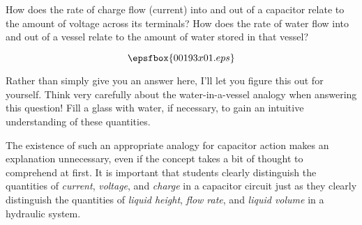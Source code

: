 

How does the rate of charge flow (current) into and out of a capacitor relate to the amount of voltage across its terminals?  How does the rate of water flow into and out of a vessel relate to the amount of water stored in that vessel?

$$\epsfbox{00193x01.eps}$$







Rather than simply give you an answer here, I'll let you figure this out for yourself.  Think very carefully about the water-in-a-vessel analogy when answering this question!  Fill a glass with water, if necessary, to gain an intuitive understanding of these quantities.







The existence of such an appropriate analogy for capacitor action makes an explanation unnecessary, even if the concept takes a bit of thought to comprehend at first.  It is important that students clearly distinguish the quantities of {\it current}, {\it voltage}, and {\it charge} in a capacitor circuit just as they clearly distinguish the quantities of {\it liquid height}, {\it flow rate}, and {\it liquid volume} in a hydraulic system.




